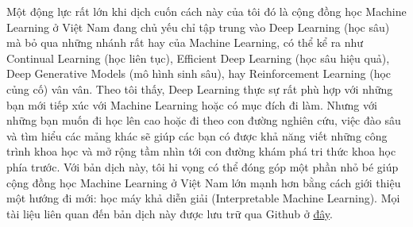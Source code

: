 Một động lực rất lớn khi dịch cuốn cách này của tôi đó là cộng đồng học Machine Learning ở Việt Nam đang chủ yếu chỉ tập trung vào Deep Learning (học sâu) mà bỏ qua những nhánh rất hay của Machine Learning, có thể kể ra như Continual Learning (học liên tục), Efficient Deep Learning (học sâu hiệu quả), Deep Generative Models (mô hình sinh sâu), hay Reinforcement Learning (học củng cố) vân vân. Theo tôi thấy, Deep Learning thực sự rất phù hợp với những bạn mới tiếp xúc với Machine Learning hoặc có mục đích đi làm. Nhưng với những bạn muốn đi học lên cao hoặc đi theo con đường nghiên cứu, việc đào sâu và tìm hiểu các mảng khác sẽ giúp các bạn có được khả năng viết những công trình khoa học và mở rộng tầm nhìn tới con đường khám phá tri thức khoa học phía trước. Với bản dịch này, tôi hi vọng có thể đóng góp một phần nhỏ bé giúp cộng đồng học Machine Learning ở Việt Nam lớn mạnh hơn bằng cách giới thiệu một hướng đi mới: học máy khả diễn giải (Interpretable Machine Learning). Mọi tài liệu liên quan đến bản dịch này được lưu trữ qua Github ở \href{https://github.com/giangnguyen2412/InterpretableMLBook-Vietnamese}{đây}.
